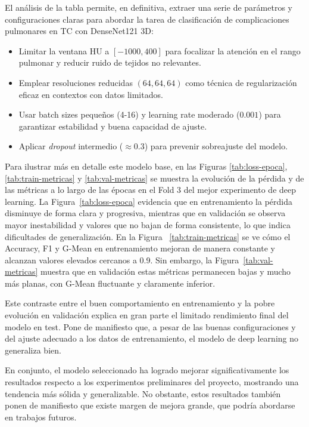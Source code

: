 El análisis de la tabla permite, en definitiva, extraer una serie de parámetros y configuraciones claras para abordar la tarea de clasificación de complicaciones pulmonares en TC con DenseNet121 3D:

\begin{itemize}
    \item Limitar la ventana HU a $[-1000,400]$ para focalizar la atención en el rango pulmonar y reducir ruido de tejidos no relevantes.
    \item Emplear resoluciones reducidas $(64,64,64)$ como técnica de regularización eficaz en contextos con datos limitados.
    \item Usar batch sizes pequeños (4-16) y learning rate moderado ($0.001$) para garantizar estabilidad y buena capacidad de ajuste.
    \item Aplicar \textit{dropout} intermedio ($\approx 0.3$) para prevenir sobreajuste del modelo.
\end{itemize}

Para ilustrar más en detalle este modelo base, en las Figuras \ref{tab:loss-epoca}, \ref{tab:train-metricas} y \ref{tab:val-metricas} se muestra la evolución de la pérdida y de las métricas a lo largo de las épocas en el Fold 3 del mejor experimento de deep learning. La Figura~\ref{tab:loss-epoca} evidencia que en entrenamiento la pérdida disminuye de forma clara y progresiva, mientras que en validación se observa mayor inestabilidad y valores que no bajan de forma consistente, lo que indica dificultades de generalización. En la Figura~ \ref{tab:train-metricas} se ve cómo el Accuracy, F1 y G-Mean en entrenamiento mejoran de manera constante y alcanzan valores elevados cercanos a 0.9. Sin embargo, la Figura~\ref{tab:val-metricas} muestra que en validación estas métricas permanecen bajas y mucho más planas, con G-Mean fluctuante y claramente inferior.  

Este contraste entre el buen comportamiento en entrenamiento y la pobre evolución en validación explica en gran parte el limitado rendimiento final del modelo en test. Pone de manifiesto que, a pesar de las buenas configuraciones y del ajuste adecuado a los datos de entrenamiento, el modelo de deep learning no generaliza bien.


En conjunto, el modelo seleccionado ha logrado mejorar significativamente los resultados respecto a los experimentos preliminares del proyecto, mostrando una tendencia más sólida y generalizable. No obstante, estos resultados también ponen de manifiesto que existe margen de mejora grande, que podría abordarse en trabajos futuros.



